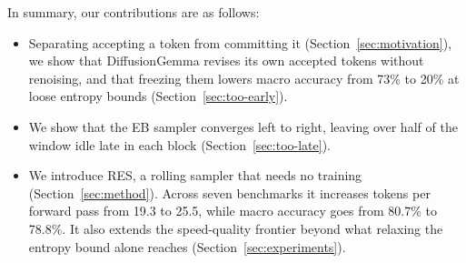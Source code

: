 In summary, our contributions are as follows:
\begin{itemize}
    \item Separating accepting a token from committing it (Section~\ref{sec:motivation}), we show that DiffusionGemma revises its own accepted tokens without renoising, and that freezing them lowers macro accuracy from 73\% to 20\% at loose entropy bounds (Section~\ref{sec:too-early}).
    \item We show that the EB sampler converges left to right, leaving over half of the window idle late in each block (Section~\ref{sec:too-late}).
    \item We introduce RES, a rolling sampler that needs no training (Section~\ref{sec:method}). Across seven benchmarks it increases tokens per forward pass from 19.3 to 25.5, while macro accuracy goes from 80.7\% to 78.8\%. It also extends the speed-quality frontier beyond what relaxing the entropy bound alone reaches (Section~\ref{sec:experiments}).
\end{itemize}
